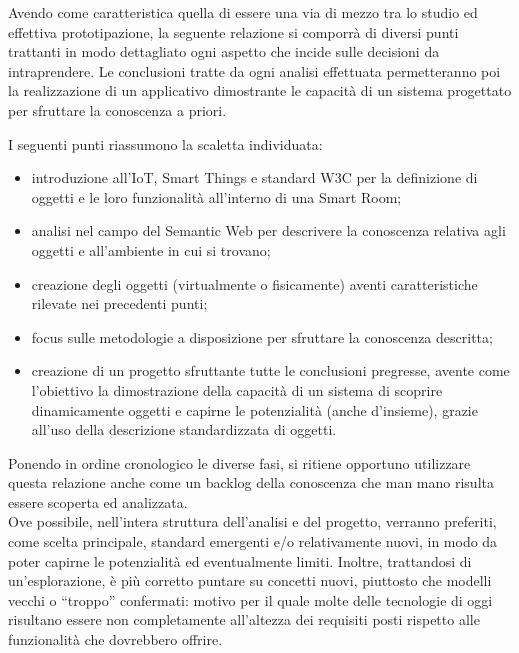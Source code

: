 \documentclass[12pt,a4paper,openright,oneside]{report}
\newcommand{\quotes}[1]{``#1''}
\begin{document}
Avendo come caratteristica quella di essere una via di mezzo tra lo studio ed effettiva prototipazione, la seguente relazione si comporrà di diversi punti trattanti in modo dettagliato ogni aspetto che incide sulle decisioni da intraprendere. Le conclusioni tratte da ogni analisi effettuata permetteranno poi la realizzazione di un applicativo dimostrante le capacità di un sistema progettato per sfruttare la conoscenza a priori. 

I seguenti punti riassumono la scaletta individuata:

\begin{itemize}
	\item introduzione all'IoT, Smart Things e standard W3C per la definizione di oggetti e le loro funzionalità all'interno di una Smart Room;
	
	\item analisi nel campo del Semantic Web per descrivere la conoscenza relativa agli oggetti e all'ambiente in cui si trovano;
	
	\item creazione degli oggetti (virtualmente o fisicamente) aventi caratteristiche rilevate nei precedenti punti;
	
	\item focus sulle metodologie a disposizione per sfruttare la conoscenza descritta;
	
	\item creazione di un progetto sfruttante tutte le conclusioni pregresse, avente come l'obiettivo la dimostrazione della capacità di un sistema di scoprire dinamicamente oggetti e capirne le potenzialità (anche d'insieme), grazie all'uso della descrizione standardizzata di oggetti.
	
\end{itemize}

Ponendo in ordine cronologico le diverse fasi, si ritiene opportuno utilizzare questa relazione anche come un backlog della conoscenza che man mano risulta essere scoperta ed analizzata.\\

\label{new_tecnologies}
Ove possibile, nell'intera struttura dell'analisi e del progetto, verranno preferiti, come scelta principale, standard emergenti e/o relativamente nuovi, in modo da poter capirne le potenzialità ed eventualmente limiti. Inoltre, trattandosi di un'esplorazione, è più corretto puntare su concetti nuovi, piuttosto che modelli vecchi o \quotes{troppo} confermati: motivo per il quale molte delle tecnologie di oggi risultano essere non completamente all'altezza dei requisiti posti rispetto alle funzionalità che dovrebbero offrire.
\end{document}
